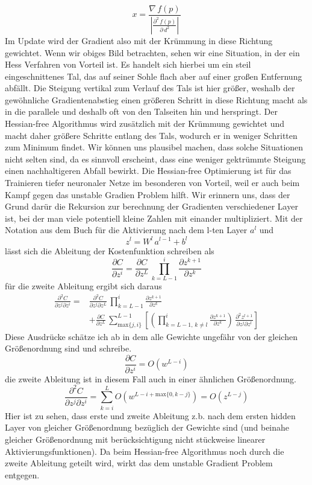 \documentclass[12pt]{article}
\newcommand{\partderv}[2]{\frac{\partial{#1}}{\partial{#2}}}
\newcommand{\twoderv}[3]{\frac{\partial^2#1}{\partial{#2}\partial{#3}}}
\begin{document}
$$x=\frac{\nabla\,f(p)}{|\frac{\partial^2\,f(p)}{\partial\,d^2}|}$$
Im Update wird der Gradient also mit der Krümmung in diese Richtung gewichtet.
Wenn wir obiges Bild betrachten, sehen wir eine Situation, in der ein Hess Verfahren von Vorteil ist. Es handelt sich hierbei um ein steil eingeschnittenes Tal, das auf seiner Sohle flach aber auf einer großen Entfernung abfällt. Die Steigung vertikal zum Verlauf des Tals ist hier größer, weshalb der gewöhnliche Gradientenabstieg einen größeren Schritt in diese Richtung macht als in die parallele und deshalb oft von den Talseiten hin und herspringt. Der Hessian-free Algorithmus wird zusätzlich mit der Krümmung gewichtet und macht daher größere Schritte entlang des Tals, wodurch er in weniger Schritten zum Minimum findet. Wir können uns plausibel machen, dass solche Situationen nicht selten sind, da es sinnvoll erscheint, dass eine weniger gektrümmte Steigung einen nachhaltigeren Abfall bewirkt. Die Hessian-free Optimierung ist für das Trainieren tiefer neuronaler Netze im besonderen von Vorteil, weil er auch beim Kampf gegen das unstable Gradien Problem hilft. Wir erinnern uns, dass der Grund darür die Rekursion zur berechnung der Gradienten verschiedener Layer ist, bei der man viele potentiell kleine Zahlen mit einander multipliziert.\newline
Mit der Notation aus dem Buch für die Aktivierung nach dem l-ten Layer $a^l$ und 
$$z^l=W^l\,a^{l-1}+b^l$$
lässt sich die Ableitung der Kostenfunktion schreiben als
$$\frac{\partial{C}}{\partial{z^i}}=\partderv{C}{z^L}\,\prod_{k=L-1}^{i}\partderv{z^{k+1}}{z^k}$$
für die zweite Ableitung ergibt sich daraus
\begin{align*}\twoderv{C}{z^j}{z^i}=&\twoderv{C}{z^j}{z^L}\,\prod_{k=L-1}^{i}\partderv{z^{k+1}}{z^k}\\
&+\partderv{C}{z^L}\,\sum_{\text{max}\{j,i\}}^{L-1}\left[\left(\prod_{k=L-1,\,k\neq{l}}^i\partderv{z^{k+1}}{z^k}\right)\,\twoderv{z^{l+1}}{z^j}{z^l}\right]\end{align*}
Diese Ausdrücke schätze ich ab in dem alle Gewichte ungefähr von der gleichen Größenordnung sind und schreibe.
$$\partderv{C}{z^i}=O(w^{L-i})$$
die zweite Ableitung ist in diesem Fall auch in einer ähnlichen Größenordnung.
$$\twoderv{C}{z^j}{z^i}=\sum_{k=i}^LO(w^{L-i+\text{max}\{0,k-j\}})=O(z^{L-j})$$
Hier ist zu sehen, dass erste und zweite Ableitung z.b. nach dem ersten hidden Layer von gleicher Größenordnung bezüglich der Gewichte sind (und beinahe gleicher Größenordnung mit berücksichtigung nicht stückweise linearer Aktivierungsfunktionen). Da beim Hessian-free Algorithmus noch durch die zweite Ableitung geteilt wird, wirkt das dem unstable Gradient Problem entgegen.\newline\newline
\end{document}
